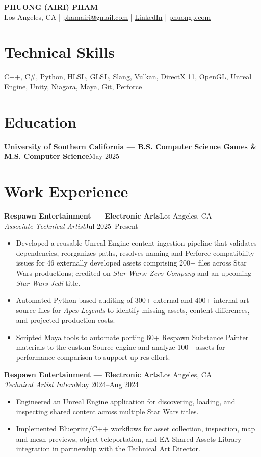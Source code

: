 \documentclass[10pt,letterpaper]{article}
\newcommand{\resumeEntry}[4]{
  \textbf{#1}\hfill #2\\
  \textit{#3}\hfill #4\\[-10pt]
}
\begin{document}
\begin{center}
    {\Large \textbf{PHUONG (AIRI) PHAM}}\\[0pt]
    Los Angeles, CA \;|\;
    \href{mailto:phamairi@gmail.com}{phamairi@gmail.com} \;|\;
    \href{https://www.linkedin.com/in/phuong-pham-airi/}{LinkedIn} \;|\;
    \href{https://www.phuongp.com/}{phuongp.com}\\[0pt]
\end{center}

\section{Technical Skills}
C++, C\#, Python, HLSL, GLSL, Slang, Vulkan, DirectX 11, OpenGL, Unreal Engine, Unity, Niagara, Maya, Git, Perforce

\section{Education}
\textbf{University of Southern California --- B.S. Computer Science Games \& M.S. Computer Science}\hfill May 2025

\section{Work Experience}

\resumeEntry{Respawn Entertainment --- Electronic Arts}{Los Angeles, CA}{Associate Technical Artist}{Jul 2025--Present}
\begin{itemize}
    \item Developed a reusable Unreal Engine content-ingestion pipeline that validates dependencies, reorganizes paths, resolves naming and Perforce compatibility issues for 46 externally developed assets comprising 200+ files across Star Wars productions; credited on \textit{Star Wars: Zero Company} and an upcoming \textit{Star Wars Jedi} title.
    \item Automated Python-based auditing of 300+ external and 400+ internal art source files for \textit{Apex Legends} to identify missing assets, content differences, and projected production costs.
    \item Scripted Maya tools to automate porting 60+ Respawn Substance Painter materials to the custom Source engine and analyze 100+ assets for performance comparison to support up-res effort.
\end{itemize}

\resumeEntry{Respawn Entertainment --- Electronic Arts}{Los Angeles, CA}{Technical Artist Intern}{May 2024--Aug 2024}
\begin{itemize}
    \item Engineered an Unreal Engine application for discovering, loading, and inspecting shared content across multiple Star Wars titles.
    \item Implemented Blueprint/C++ workflows for asset collection, inspection, map and mesh previews, object teleportation, and EA Shared Assets Library integration in partnership with the Technical Art Director.
\end{itemize}
\end{document}

